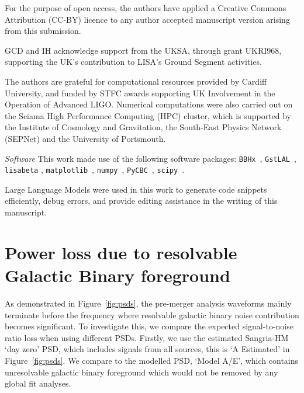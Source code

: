 \documentclass[%
 reprint,
superscriptaddress,
 nofootinbib,
 amsmath,amssymb,
 aps,
 prd,
]{revtex4-2}
\newcommand{\updated}[1]{#1}
\begin{document}
\begin{acknowledgments}
For the purpose of open access, the authors have applied a Creative Commons Attribution (CC-BY)
licence to any author accepted manuscript version arising from this submission.

GCD and IH acknowledge support from the UKSA, through grant UKRI968,
supporting the UK's contribution to LISA's Ground
Segment activities.

The authors are grateful for computational resources provided
by Cardiff University, and funded by STFC awards supporting
UK Involvement in the Operation of Advanced LIGO.
Numerical computations were also carried out on the Sciama High
Performance Computing (HPC) cluster, which is supported by the
Institute of Cosmology and Gravitation, the South-East Physics
Network (SEPNet) and the University of Portsmouth.

\textit{Software} This work made use of the following software packages:
\texttt{BBHx}~\cite{michael_katz_2023_7791640},
\texttt{GstLAL}~\cite{Cannon:2020qnf},
\texttt{lisabeta} \cite{Marsat:2020rtl},
\texttt{matplotlib}~\cite{Hunter:2007},
\texttt{numpy}~\cite{harris2020array},
\texttt{PyCBC}~\cite{alex_nitz_2024_10473621},
\texttt{scipy}~\cite{2020SciPy-NMeth}.

Large Language Models were used in this work to generate code snippets efficiently,
debug errors, and provide editing assistance in the writing of this manuscript.

\end{acknowledgments}

\appendix

\section{Power loss due to resolvable Galactic Binary foreground}
\label{sec:gb_noise_snr_loss}
\updated{As demonstrated in Figure~\ref{fig:psds}, the pre-merger analysis waveforms mainly terminate before the frequency where resolvable galactic binary noise contribution becomes significant.
To investigate this, we compare the expected signal-to-noise ratio loss when using different PSDs.
Firstly, we use the estimated Sangria-HM `day zero' PSD, which includes signals from all sources, this is `A Estimated' in Figure~\ref{fig:psds}.
We compare to the modelled PSD, `Model A/E', which contains unresolvable galactic binary foreground which would not be removed by any global fit analyses.}
\end{document}
